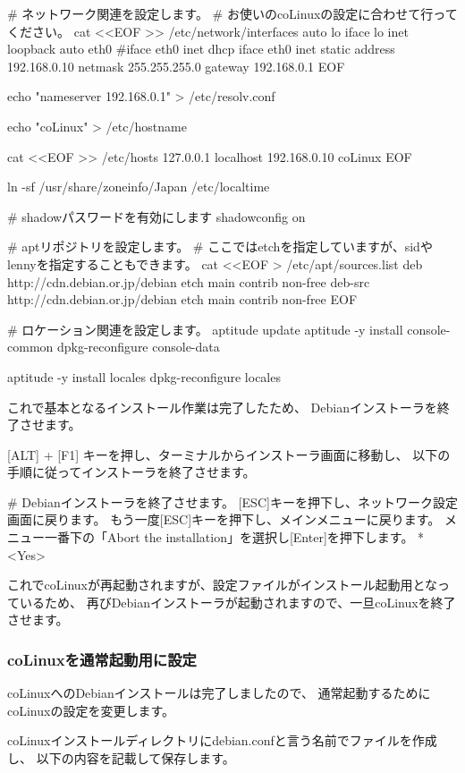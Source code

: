 \documentclass[mingoth,a4paper]{jsarticle}
\begin{document}
\begin{commandline}
# ネットワーク関連を設定します。
# お使いのcoLinuxの設定に合わせて行ってください。
cat <<EOF >> /etc/network/interfaces
auto lo
iface lo inet loopback
auto eth0
#iface eth0 inet dhcp
iface eth0 inet static
  address 192.168.0.10
  netmask 255.255.255.0
  gateway 192.168.0.1
EOF

echo "nameserver 192.168.0.1" > /etc/resolv.conf

echo "coLinux" > /etc/hostname

cat <<EOF >> /etc/hosts
127.0.0.1      localhost
192.168.0.10   coLinux
EOF

ln -sf /usr/share/zoneinfo/Japan  /etc/localtime

# shadowパスワードを有効にします
shadowconfig on

# aptリポジトリを設定します。
# ここではetchを指定していますが、sidやlennyを指定することもできます。
cat <<EOF > /etc/apt/sources.list
deb http://cdn.debian.or.jp/debian etch main contrib non-free
deb-src http://cdn.debian.or.jp/debian etch main contrib non-free
EOF

# ロケーション関連を設定します。
aptitude update
aptitude -y install console-common
dpkg-reconfigure console-data

aptitude -y install locales
dpkg-reconfigure locales
\end{commandline}

これで基本となるインストール作業は完了したため、
Debianインストーラを終了させます。

[ALT] + [F1] キーを押し、ターミナルからインストーラ画面に移動し、
以下の手順に従ってインストーラを終了させます。

\begin{commandline}
# Debianインストーラを終了させます。
[ESC]キーを押下し、ネットワーク設定画面に戻ります。
もう一度[ESC]キーを押下し、メインメニューに戻ります。
メニュー一番下の「Abort the installation」を選択し[Enter]を押下します。
* <Yes>
\end{commandline}
これでcoLinuxが再起動されますが、設定ファイルがインストール起動用となっているため、
再びDebianインストーラが起動されますので、一旦coLinuxを終了させます。

\subsubsection{coLinuxを通常起動用に設定}
coLinuxへのDebianインストールは完了しましたので、
通常起動するためにcoLinuxの設定を変更します。

coLinuxインストールディレクトリにdebian.confと言う名前でファイルを作成し、
以下の内容を記載して保存します。
\end{document}
